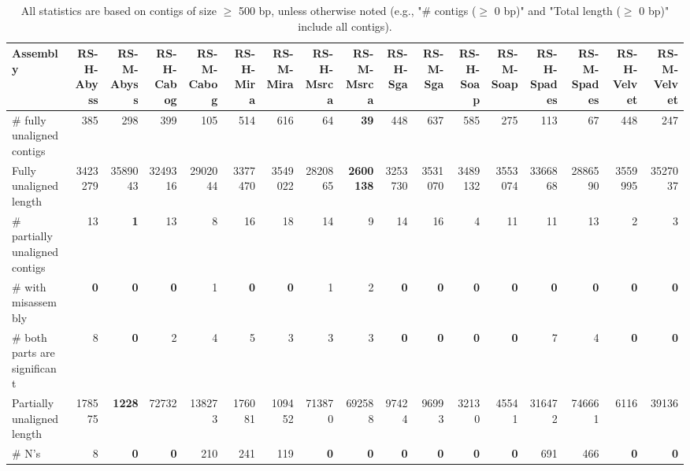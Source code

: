 \documentclass[12pt,a4paper]{article}
\begin{document}
\begin{table}[ht]
\begin{center}
\caption{All statistics are based on contigs of size $\geq$ 500 bp, unless otherwise noted (e.g., "\# contigs ($\geq$ 0 bp)" and "Total length ($\geq$ 0 bp)" include all contigs).}
\begin{tabular}{|l*{16}{|r}|}
\hline
Assembly & RS-H-Abyss & RS-M-Abyss & RS-H-Cabog & RS-M-Cabog & RS-H-Mira & RS-M-Mira & RS-H-Msrca & RS-M-Msrca & RS-H-Sga & RS-M-Sga & RS-H-Soap & RS-M-Soap & RS-H-Spades & RS-M-Spades & RS-H-Velvet & RS-M-Velvet \\ \hline
\# fully unaligned contigs & 385 & 298 & 399 & 105 & 514 & 616 & 64 & {\bf 39} & 448 & 637 & 585 & 275 & 113 & 67 & 448 & 247 \\ \hline
Fully unaligned length & 3423279 & 3589043 & 3249316 & 2902044 & 3377470 & 3549022 & 2820865 & {\bf 2600138} & 3253730 & 3531070 & 3489132 & 3553074 & 3366868 & 2886590 & 3559995 & 3527037 \\ \hline
\# partially unaligned contigs & 13 & {\bf 1} & 13 & 8 & 16 & 18 & 14 & 9 & 14 & 16 & 4 & 11 & 11 & 13 & 2 & 3 \\ \hline
\hspace{5mm}\# with misassembly & {\bf 0} & {\bf 0} & {\bf 0} & 1 & {\bf 0} & {\bf 0} & 1 & 2 & {\bf 0} & {\bf 0} & {\bf 0} & {\bf 0} & {\bf 0} & {\bf 0} & {\bf 0} & {\bf 0} \\ \hline
\hspace{5mm}\# both parts are significant & 8 & {\bf 0} & 2 & 4 & 5 & 3 & 3 & 3 & {\bf 0} & {\bf 0} & {\bf 0} & {\bf 0} & 7 & 4 & {\bf 0} & {\bf 0} \\ \hline
Partially unaligned length & 178575 & {\bf 1228} & 72732 & 138273 & 176081 & 109452 & 713870 & 692588 & 97424 & 96993 & 32130 & 45541 & 316472 & 746661 & 6116 & 39136 \\ \hline
\# N's & 8 & {\bf 0} & {\bf 0} & 210 & 241 & 119 & {\bf 0} & {\bf 0} & {\bf 0} & {\bf 0} & {\bf 0} & {\bf 0} & 691 & 466 & {\bf 0} & {\bf 0} \\ \hline
\end{tabular}
\end{center}
\end{table}
\end{document}
